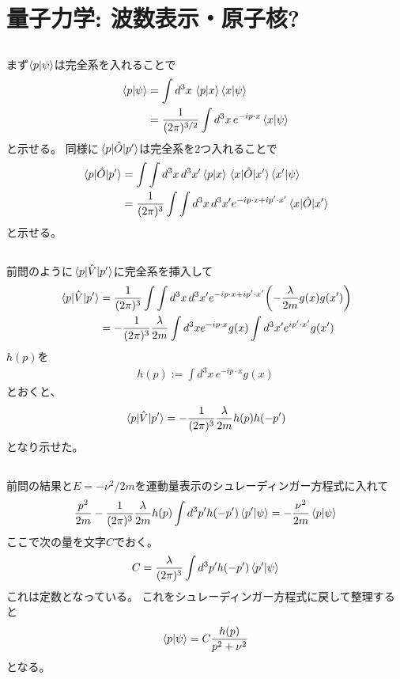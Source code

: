\documentclass[../../master.tex]{subfiles}
\begin{document}
\section{量子力学: 波数表示・原子核?}
\subsection{}
まず\(\braket{p}{\psi}\)は完全系を入れることで
\begin{align}
    \braket{p}{\psi}
    &=\int d^3x\, \braket{p}{x}\braket{x}{\psi}\\
    &=\frac{1}{(2\pi)^{3/2}}\int d^3x\, e^{-ip\cdot x}\bra{x}\ket{\psi}
\end{align}
と示せる。
同様に\(\mel{p}{\hat{O}}{p'}\)は完全系を2つ入れることで
\begin{align}
    \mel{p}{\hat{O}}{p'}
    &= \int \int d^3x\,d^3x' \braket{p}{x}\mel{x}{\hat{O}}{x'}\braket{x'}{\psi}\\
    &= \frac{1}{(2\pi)^3}\int \int d^3x\,d^3x' e^{-ip\cdot x + ip'\cdot x'}\mel{x}{\hat{O}}{x'}
\end{align}
と示せる。

\subsection{}
前問のように\(\mel{p}{\hat{V}}{p'}\)に完全系を挿入して
\begin{align}
    \mel{p}{\hat{V}}{p'}
    &= \frac{1}{(2\pi)^3}\int \int d^3x\,d^3x' e^{-ip\cdot x + ip'\cdot x'}\qty(-\frac{\lambda}{2m}g(x)g(x'))\\
    &= -\frac{1}{(2\pi)^3}\frac{\lambda}{2m}\int d^3x e^{-ip\cdot x}g(x) \int d^3x' e^{ip'\cdot x'} g(x')
\end{align}
\(h(p)\)を
\begin{align}
    h(p) := \int d^3x\, e^{-ip\cdot x}g(x)
\end{align}
とおくと、
\begin{align}
    \mel{p}{\hat{V}}{p'} = -\frac{1}{(2\pi)^3}\frac{\lambda}{2m}h(p)h(-p')
\end{align}
となり示せた。

\subsection{}
前問の結果と\(E=-\nu^2/2m\)を運動量表示のシュレーディンガー方程式に入れて
\begin{align}
    \frac{p^2}{2m}-\frac{1}{(2\pi)^3}\frac{\lambda}{2m}h(p)
        \int d^3p' h(-p')\braket{p'}{\psi}
    = -\frac{\nu^2}{2m}\braket{p}{\psi}
\end{align}
ここで次の量を文字\(C\)でおく。
\begin{align}
    C = \frac{\lambda}{(2\pi)^3}\int d^3p' h(-p')\braket{p'}{\psi}
\end{align}
これは定数となっている。
これをシュレーディンガー方程式に戻して整理すると
\begin{align}
    \braket{p}{\psi} = C\frac{h(p)}{p^2+\nu^2}
\end{align}
となる。
\end{document}
